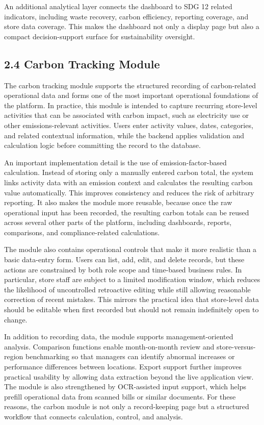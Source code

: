 \documentclass[10pt,a4paper]{article}
\begin{document}
An additional analytical layer connects the dashboard to SDG 12 related indicators, including waste recovery, carbon efficiency, reporting coverage, and store data coverage. This makes the dashboard not only a display page but also a compact decision-support surface for sustainability oversight.

\subsection*{2.4 Carbon Tracking Module}
The carbon tracking module supports the structured recording of carbon-related operational data and forms one of the most important operational foundations of the platform. In practice, this module is intended to capture recurring store-level activities that can be associated with carbon impact, such as electricity use or other emissions-relevant activities. Users enter activity values, dates, categories, and related contextual information, while the backend applies validation and calculation logic before committing the record to the database.

An important implementation detail is the use of emission-factor-based calculation. Instead of storing only a manually entered carbon total, the system links activity data with an emission context and calculates the resulting carbon value automatically. This improves consistency and reduces the risk of arbitrary reporting. It also makes the module more reusable, because once the raw operational input has been recorded, the resulting carbon totals can be reused across several other parts of the platform, including dashboards, reports, comparisons, and compliance-related calculations.

The module also contains operational controls that make it more realistic than a basic data-entry form. Users can list, add, edit, and delete records, but these actions are constrained by both role scope and time-based business rules. In particular, store staff are subject to a limited modification window, which reduces the likelihood of uncontrolled retroactive editing while still allowing reasonable correction of recent mistakes. This mirrors the practical idea that store-level data should be editable when first recorded but should not remain indefinitely open to change.

In addition to recording data, the module supports management-oriented analysis. Comparison functions enable month-on-month review and store-versus-region benchmarking so that managers can identify abnormal increases or performance differences between locations. Export support further improves practical usability by allowing data extraction beyond the live application view. The module is also strengthened by OCR-assisted input support, which helps prefill operational data from scanned bills or similar documents. For these reasons, the carbon module is not only a record-keeping page but a structured workflow that connects calculation, control, and analysis.
\end{document}
